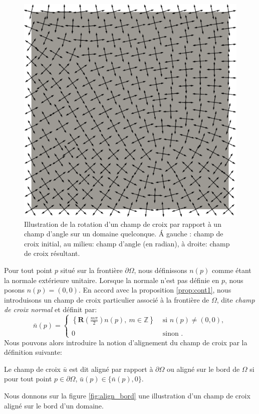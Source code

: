 \begin{figure}[h!]
  \includegraphics[scale=0.171]{images/result_field.pdf}
  \caption{Illustration de la rotation d'un champ de croix par rapport à un champ d'angle sur un domaine quelconque. \'A gauche : champ de croix initial, au milieu: champ d'angle (en radian), à droite: champ de croix résultant.}
  \label{fig:rot_cross}
\end{figure}

Pour tout point $p$ situé sur la frontière $\partial\Omega$, nous définissons $n(p)$ comme étant la normale extérieure unitaire. Lorsque la normale n'est pas définie en $p$, nous posons $n(p)=(0,0)$. En accord avec la proposition \ref{prop:cont1}, nous introduisons un champ de croix particulier associé à la frontière de $\Omega$, dite \emph{champ de croix normal} et définit par:
\begin{equation}
    \bar{n}(p) =
\left\{
    \begin{array}{ll}
        \left\{\mathbf{R}\left(\frac{m\pi}{2}\right)n(p),~ m\in \mathbb{Z}\right\} &\text{ si }n(p)\neq (0,0),\\\\
        0& \text{ sinon }.
    \end{array}
\right.
\end{equation}
Nous pouvons alors introduire la notion d'alignement du champ de croix par la définition suivante:
\begin{definition}
    Le champ de croix $\bar{u}$ est dit aligné par rapport à $\partial\Omega$ ou aligné sur le bord de $\Omega$ si pour tout point $p\in\partial\Omega$, $\bar{u}(p)\in\{\bar{n}(p), 0\}$.
\end{definition}
Nous donnons sur la figure \ref{fig:align_bord} une illustration d'un champ de croix aligné sur le bord d'un domaine.


